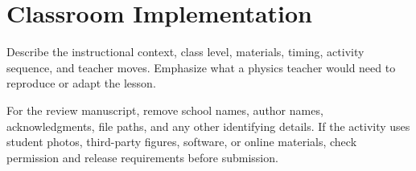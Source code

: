 \section{Classroom Implementation}

Describe the instructional context, class level, materials, timing, activity sequence, and teacher moves. Emphasize what a physics teacher would need to reproduce or adapt the lesson.

For the review manuscript, remove school names, author names, acknowledgments, file paths, and any other identifying details. If the activity uses student photos, third-party figures, software, or online materials, check permission and release requirements before submission.
